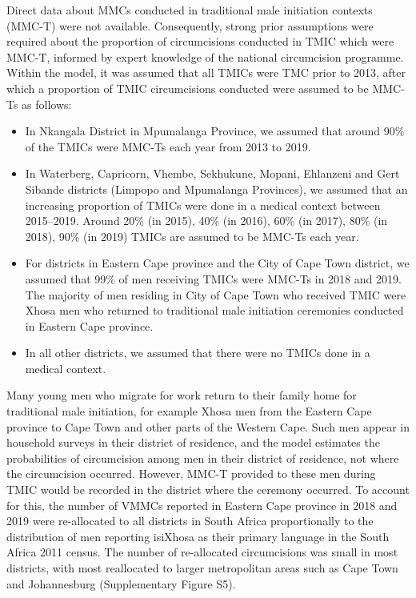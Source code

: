 \documentclass{article}
\begin{document}
Direct data about MMCs conducted in traditional male initiation contexts (MMC-T) were not available. Consequently, strong prior assumptions were required about the proportion of circumcisions conducted in TMIC which were MMC-T, informed by expert knowledge of the national circumcision programme. Within the model, it was assumed that all TMICs were TMC prior to 2013, after which a proportion of TMIC circumcisions conducted were assumed to be MMC-Ts as follows:
\begin{itemize}
\item In Nkangala District in Mpumalanga Province, we assumed that around 90\% of the TMICs were MMC-Ts each year from 2013 to 2019.
\item In Waterberg, Capricorn, Vhembe, Sekhukune, Mopani, Ehlanzeni and Gert Sibande districts (Limpopo and Mpumalanga Provinces), we assumed that an increasing proportion of TMICs were done in a medical context between 2015--2019. Around 20\% (in 2015), 40\% (in 2016), 60\% (in 2017), 80\% (in 2018), 90\% (in 2019) TMICs are assumed to be MMC-Ts each year.
\item For districts in Eastern Cape province and the City of Cape Town district, we assumed that 99\% of men receiving TMICs were MMC-Ts in 2018 and 2019. The majority of men residing in City of Cape Town who received TMIC were Xhosa men who returned to traditional male initiation ceremonies conducted in Eastern Cape province.
\item In all other districts, we assumed that there were no TMICs done in a medical context.
\end{itemize}

Many young men who migrate for work return to their family home for traditional male initiation, for example Xhosa men from the Eastern Cape province to Cape Town and other parts of the Western Cape. Such men appear in household surveys in their district of residence, and the model estimates the probabilities of circumcision among men in their district of residence, not where the circumcision occurred. However, MMC-T provided to these men during TMIC would be recorded in the district where the ceremony occurred. To account for this, the number of VMMCs reported in Eastern Cape province in 2018 and 2019 were re-allocated to all districts in South Africa proportionally to the distribution of men reporting isiXhosa as their primary language in the South Africa 2011 census. The number of re-allocated circumcisions was small in most districts, with most reallocated to larger metropolitan areas such as Cape Town and Johannesburg (Supplementary Figure S5).
\end{document}
